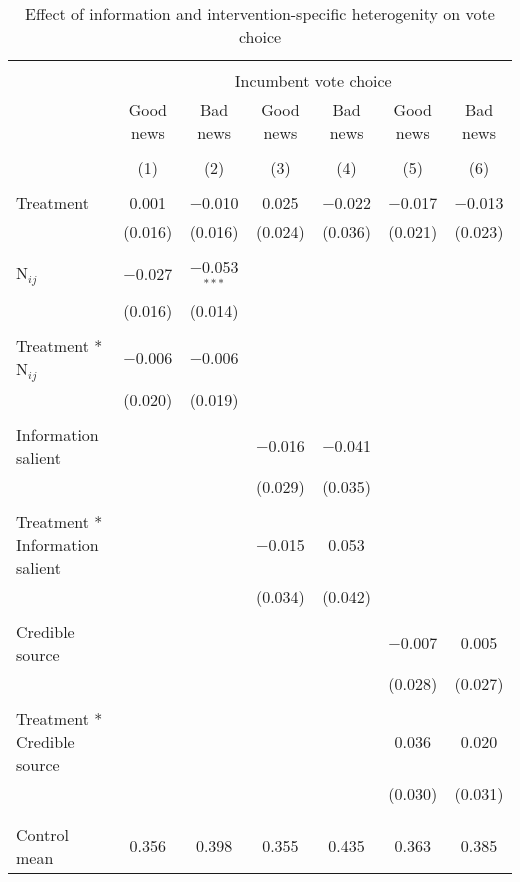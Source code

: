 
\begin{table}[!htbp] \centering  \footnotesize
  \caption{Effect of information and intervention-specific heterogenity on vote choice} 
  \label{intervention_hetero} 
\begin{tabular}{@{\extracolsep{1pt}}lcccccc} 
\\[-1.8ex]\hline 
\hline \\[-1.8ex] 
 & \multicolumn{6}{c}{Incumbent vote choice} \\ 
\cline{2-7} 
 & Good news & Bad news & Good news & Bad news & Good news & Bad news \\ 
\cline{2-7}
\\[-1.8ex] & (1) & (2) & (3) & (4) & (5) & (6)\\ 
\hline \\[-1.8ex] 
 Treatment & 0.001 & $-$0.010 & 0.025 & $-$0.022 & $-$0.017 & $-$0.013 \\ 
  & (0.016) & (0.016) & (0.024) & (0.036) & (0.021) & (0.023) \\ 
  & & & & & & \\ 
 N$_{ij}$ & $-$0.027 & $-$0.053$^{***}$ &  &  &  &  \\ 
  & (0.016) & (0.014) &  &  &  &  \\ 
  & & & & & & \\ 
 Treatment * N$_{ij}$ & $-$0.006 & $-$0.006 &  &  &  &  \\ 
  & (0.020) & (0.019) &  &  &  &  \\ 
  & & & & & & \\ 
 Information salient &  &  & $-$0.016 & $-$0.041 &  &  \\ 
  &  &  & (0.029) & (0.035) &  &  \\ 
  & & & & & & \\ 
 Treatment * Information salient &  &  & $-$0.015 & 0.053 &  &  \\ 
  &  &  & (0.034) & (0.042) &  &  \\ 
  & & & & & & \\ 
 Credible source &  &  &  &  & $-$0.007 & 0.005 \\ 
  &  &  &  &  & (0.028) & (0.027) \\ 
  & & & & & & \\ 
 Treatment * Credible source &  &  &  &  & 0.036 & 0.020 \\ 
  &  &  &  &  & (0.030) & (0.031) \\ 
  & & & & & & \\ 
\hline \\[-1.8ex] 
Control mean & 0.356 & 0.398 & 0.355 & 0.435 & 0.363 & 0.385 \\ 

\end{tabular}
\end{table}
